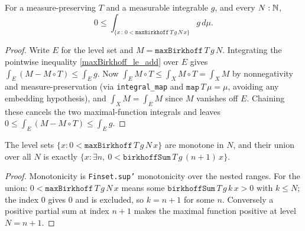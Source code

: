 \begin{proposition}\label{setIntegral_maxBirkhoff_pos_nonneg}
  \leanok
  For a measure-preserving \(T\) and a measurable integrable \(g\), and every
  \(N : \mathbb{N}\),
  \[
    0 \le \int_{\{x \,:\, 0 < \texttt{maxBirkhoff}\,T\,g\,N\,x\}} g \, d\mu.
  \]
\end{proposition}
\begin{proof}\leanok
  Write \(E\) for the level set and \(M = \texttt{maxBirkhoff}\,T\,g\,N\).
  Integrating the pointwise inequality \cref{maxBirkhoff_le_add} over \(E\)
  gives \(\int_E (M - M \circ T) \le \int_E g\). Now \(\int_E M \circ T \le
  \int_X M \circ T = \int_X M\) by nonnegativity and measure-preservation (via
  \texttt{integral\_map} and \(\texttt{map}\,T\,\mu = \mu\), avoiding any
  embedding hypothesis), and \(\int_X M = \int_E M\) since \(M\) vanishes off
  \(E\). Chaining these cancels the two maximal-function integrals and leaves
  \(0 \le \int_E (M - M\circ T) \le \int_E g\).
\end{proof}

\begin{lemma}\label{iUnion_setOf_maxBirkhoff_pos}
  \leanok
  The level sets \(\{x : 0 < \texttt{maxBirkhoff}\,T\,g\,N\,x\}\) are monotone
  in \(N\), and their union over all \(N\) is exactly
  \(\{x : \exists n,\ 0 < \texttt{birkhoffSum}\,T\,g\,(n+1)\,x\}\).
\end{lemma}
\begin{proof}\leanok
  Monotonicity is \texttt{Finset.sup'} monotonicity over the nested ranges.
  For the union: \(0 < \texttt{maxBirkhoff}\,T\,g\,N\,x\) means some
  \(\texttt{birkhoffSum}\,T\,g\,k\,x > 0\) with \(k \le N\); the index \(0\)
  gives \(0\) and is excluded, so \(k = n+1\) for some \(n\). Conversely a
  positive partial sum at index \(n+1\) makes the maximal function positive at
  level \(N = n+1\).
\end{proof}

